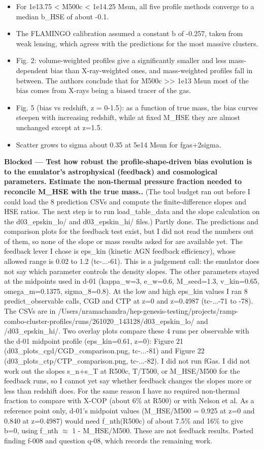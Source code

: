 \documentclass[11pt,a4paper]{article}
\begin{document}
\begin{itemize}
  \item For 1e13.75 \textless{} M500c \textless{} 1e14.25 Msun, all five profile methods converge to a median b\_HSE of about -0.1.
  \item The FLAMINGO calibration assumed a constant b of -0.257, taken from weak lensing, which agrees with the predictions for the most massive clusters.
  \item Fig. 2: volume-weighted profiles give a significantly smaller and less mass-dependent bias than X-ray-weighted ones, and mass-weighted profiles fall in between. The authors conclude that for M500c \textgreater{}\textgreater{} 1e13 Msun most of the bias comes from X-rays being a biased tracer of the gas.
  \item Fig. 5 (bias vs redshift, z = 0-1.5): as a function of true mass, the bias curves steepen with increasing redshift, while at fixed M\_HSE they are almost unchanged except at z=1.5.
  \item Scatter grows to sigma about 0.35 at 5e14 Msun for fgas+2sigma.
\end{itemize}
\textbf{Blocked --- Test how robust the profile-shape-driven bias evolution is to the emulator's astrophysical (feedback) and cosmological parameters. Estimate the non-thermal pressure fraction needed to reconcile M\_HSE with the true mass..} (The tool budget ran out before I could load the 8 prediction CSVs and compute the finite-difference slopes and HSE ratios. The next step is to run load\_table\_data and the slope calculation on the d03\_epskin\_lo/ and d03\_epskin\_hi/ files.) Partly done. The predictions and comparison plots for the feedback test exist, but I did not read the numbers out of them, so none of the slope or mass results asked for are available yet. The feedback lever I chose is eps\_kin (kinetic AGN feedback efficiency), whose allowed range is 0.02 to 1.2 (tc-...-61). This is a judgement call: the emulator does not say which parameter controls the density slopes. The other parameters stayed at the midpoints used in d-01 (kappa\_w=3, e\_w=0.6, M\_seed=1.3, v\_kin=0.65, omega\_m=0.1375, sigma\_8=0.8). At the low and high eps\_kin values I ran 8 predict\_observable calls, CGD and CTP at z=0 and z=0.4987 (tc-...-71 to -78). The CSVs are in /Users/nramachandra/hep-genesis-testing/projects/ramp-combo-cluster-profiles/runs/261020\_143128/d03\_epskin\_lo/ and /d03\_epskin\_hi/. Two overlay plots compare these 4 runs per observable with the d-01 midpoint profile (eps\_kin=0.61, z=0): Figure 21 (d03\_plots\_cgd/CGD\_comparison.png, tc-...-81) and Figure 22 (d03\_plots\_ctp/CTP\_comparison.png, tc-...-82). I did not run fGas. I did not work out the slopes s\_n+s\_T at R500c, T/T500, or M\_HSE/M500 for the feedback runs, so I cannot yet say whether feedback changes the slopes more or less than redshift does. For the same reason I have no required non-thermal fraction to compare with X-COP (about 6\% at R500) or with Nelson et al. As a reference point only, d-01's midpoint values (M\_HSE/M500 = 0.925 at z=0 and 0.840 at z=0.4987) would need f\_nth(R500c) of about 7.5\% and 16\% to give b=0, using f\_nth $\approx$ 1 - M\_HSE/M500. These are not feedback results. Posted finding f-008 and question q-08, which records the remaining work.
\end{document}
